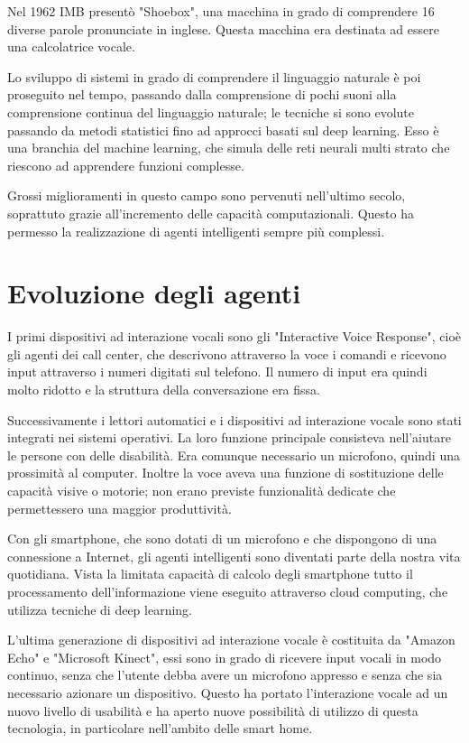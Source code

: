 \documentclass[twoside]{supsistudent}
\begin{document}
Nel 1962 IMB presentò "Shoebox", una macchina in grado di comprendere 16 diverse parole pronunciate in inglese. Questa macchina era destinata ad essere una calcolatrice vocale.

Lo sviluppo di sistemi in grado di comprendere il linguaggio naturale è poi proseguito nel tempo, passando dalla comprensione di pochi suoni alla comprensione continua del linguaggio naturale; le tecniche si sono evolute passando da metodi statistici fino ad approcci basati sul deep learning. Esso è una branchia del machine learning, che simula delle reti neurali multi strato che riescono ad apprendere funzioni complesse. \cite{deeplearninggeneral}

Grossi miglioramenti in questo campo sono pervenuti nell'ultimo secolo, soprattuto grazie all'incremento delle capacità computazionali. Questo ha permesso la realizzazione di agenti intelligenti sempre più complessi.

\section{Evoluzione degli agenti}

I primi dispositivi ad interazione vocali sono gli "Interactive Voice Response", cioè gli agenti dei call center, che descrivono attraverso la voce i comandi e ricevono input attraverso i numeri digitati sul telefono. Il numero di input era quindi molto ridotto e la struttura della conversazione era fissa.

Successivamente i lettori automatici e i dispositivi ad interazione vocale sono stati integrati nei sistemi operativi. La loro funzione principale consisteva nell'aiutare le persone con delle disabilità. Era comunque necessario un microfono, quindi una prossimità al computer. Inoltre la voce aveva una funzione di sostituzione delle capacità visive o motorie; non erano previste funzionalità dedicate che permettessero una maggior produttività.

Con gli smartphone, che sono dotati di un microfono e che dispongono di una connessione a Internet, gli agenti intelligenti sono diventati parte della nostra vita quotidiana. Vista la limitata capacità di calcolo degli smartphone tutto il processamento dell'informazione viene eseguito attraverso cloud computing, che utilizza tecniche di deep learning. \cite{deeplearninggeneral}

L'ultima generazione di dispositivi ad interazione vocale è costituita da "Amazon Echo" e "Microsoft Kinect", essi sono in grado di ricevere input vocali in modo continuo, senza che l'utente debba avere un microfono appresso e senza che sia necessario azionare un dispositivo. Questo ha portato l'interazione vocale ad un nuovo livello di usabilità e ha aperto nuove possibilità di utilizzo di questa tecnologia, in particolare nell'ambito delle smart home.
\end{document}
